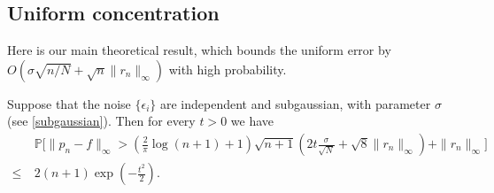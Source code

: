 \documentclass[final,onefignum,onetabnum]{siamart220329}
\begin{document}
\subsection{Uniform concentration}\label{sec:uniformconv} 
Here is our main theoretical result, which bounds the uniform error by $O({\sigma}\sqrt{{n}/{N}}+\sqrt{n}\|r_n\|_\infty)$ with high probability. 
\begin{theorem}\label{thm:infnorm}
	Suppose that the noise $ \{ \epsilon_i \}$ are independent and subgaussian, with parameter $\sigma$ (see \eqref{subgaussian}). Then for every $t>0$ we have 
	\begin{align*}
		&\mathbb{P}\bigg[\| p_n-f \|_\infty>\left( \frac{2}{\pi}\log(n+1)+1 \right) \sqrt{n+1} \left( 2 t \frac{\sigma}{\sqrt{N}}+\sqrt{8} \|r_n\|_\infty \right) + \|r_n\|_\infty \bigg] \nonumber \\
		\leq \ & 2(n+1)\exp \left( -\frac{t^2}{2} \right).   \label{eq:mainthmexp}
	\end{align*}
\end{theorem}
\end{document}
